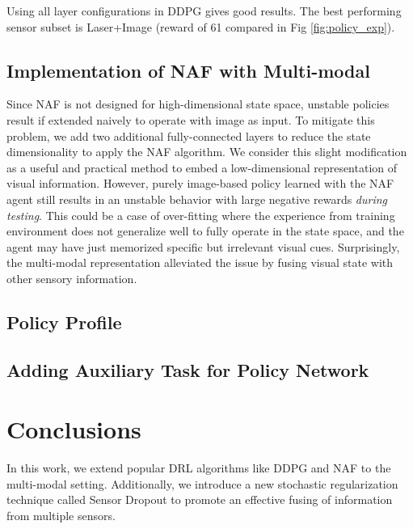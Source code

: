 \documentclass[../thesis.tex]{subfiles}
\begin{document}
Using all layer configurations in DDPG gives good results.  The best performing sensor subset is Laser+Image (reward of 61 compared in Fig \ref{fig:policy_exp}). 

\subsection{Implementation of NAF with Multi-modal} \label{discussion-NAF}
Since NAF is not designed for high-dimensional state space, unstable policies result if extended naively to operate with image as input. To mitigate this problem, we add two additional fully-connected layers to reduce the state dimensionality to apply the NAF algorithm. We consider this slight modification as a useful and practical method to embed a low-dimensional representation of visual information. However, purely image-based policy learned with the NAF agent still results in an unstable behavior with large negative rewards \emph{during testing}. This could be a case of over-fitting where the experience from training environment does not generalize well to fully operate in the state space, and the agent may have just memorized specific but irrelevant visual cues. Surprisingly, the multi-modal representation alleviated the issue by fusing visual state with other sensory information. 

\subsection{Policy Profile}

\subsection{Adding Auxiliary Task for Policy Network}



\section{Conclusions}
In this work, we extend popular DRL algorithms like DDPG and NAF to the multi-modal setting. Additionally, we introduce a new stochastic regularization technique called Sensor Dropout to promote an effective fusing of information from multiple sensors. 
\end{document}
